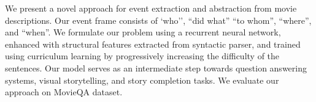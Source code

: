 We present a novel approach for event extraction and abstraction from movie descriptions. Our event frame consists of `who'', ``did what'' ``to whom'', ``where'', and ``when''. We formulate our problem using a recurrent neural network, enhanced with structural features extracted from syntactic parser, and trained using curriculum learning by progressively increasing the difficulty of the sentences. Our model serves as an intermediate step towards question answering systems, visual storytelling, and story completion tasks. We evaluate our approach on MovieQA dataset.
